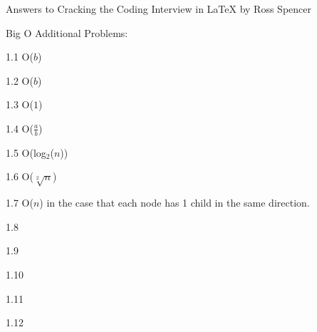 \documentclass{article}
\begin{document}
Answers to Cracking the Coding Interview in \LaTeX
by Ross Spencer


Big O Additional Problems:

1.1 O($b$)

1.2 O($b$)

1.3 O($1$)

1.4 O($\frac{a}{b}$)

1.5 O(log$_2$($n$))

1.6 O($\sqrt[2]{n}$)

1.7 O($n$) in the case that each node has 1 child in the same direction.

1.8

1.9

1.10

1.11

1.12
\end{document}
